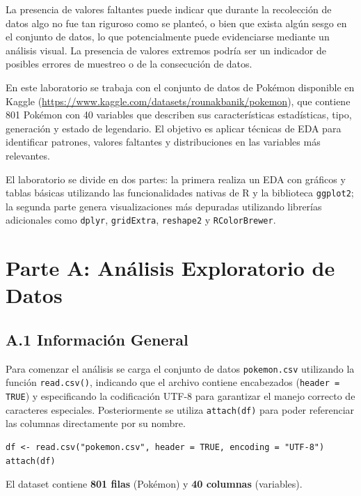 \documentclass[11pt,a4paper]{article}
\begin{document}
La presencia de valores faltantes puede indicar que durante la recolección de datos algo no fue tan riguroso
como se planteó, o bien que exista algún sesgo en el conjunto de datos, lo que potencialmente puede
evidenciarse mediante un análisis visual. La presencia de valores extremos podría ser un indicador de posibles
errores de muestreo o de la consecución de datos.

En este laboratorio se trabaja con el conjunto de datos de Pokémon disponible en Kaggle
(\url{https://www.kaggle.com/datasets/rounakbanik/pokemon}), que contiene 801 Pokémon con 40 variables
que describen sus características estadísticas, tipo, generación y estado de legendario. El objetivo es
aplicar técnicas de EDA para identificar patrones, valores faltantes y distribuciones en las variables más
relevantes.

El laboratorio se divide en dos partes: la primera realiza un EDA con gráficos y tablas básicas utilizando
las funcionalidades nativas de R y la biblioteca \texttt{ggplot2}; la segunda parte genera visualizaciones
más depuradas utilizando librerías adicionales como \texttt{dplyr}, \texttt{gridExtra}, \texttt{reshape2}
y \texttt{RColorBrewer}.

\section{Parte A: Análisis Exploratorio de Datos}

\subsection{A.1 Información General}

Para comenzar el análisis se carga el conjunto de datos \texttt{pokemon.csv} utilizando la función
\texttt{read.csv()}, indicando que el archivo contiene encabezados (\texttt{header = TRUE}) y
especificando la codificación UTF-8 para garantizar el manejo correcto de caracteres especiales.
Posteriormente se utiliza \texttt{attach(df)} para poder referenciar las columnas directamente por su nombre.

\begin{lstlisting}[style=Rstyle, caption={Carga del conjunto de datos}]
df <- read.csv("pokemon.csv", header = TRUE, encoding = "UTF-8")
attach(df)
\end{lstlisting}

El dataset contiene \textbf{801 filas} (Pokémon) y \textbf{40 columnas} (variables).
\end{document}
